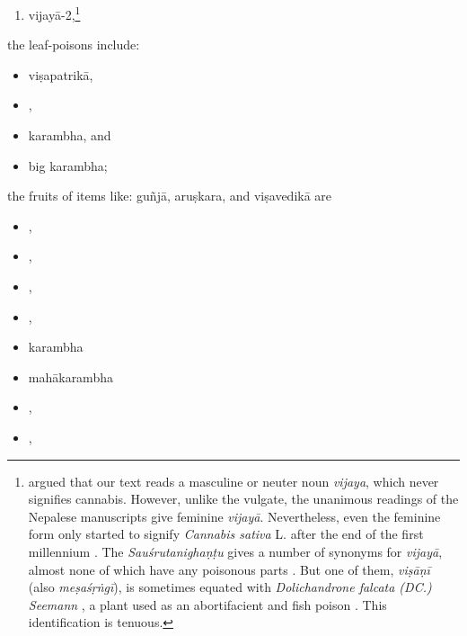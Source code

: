 \begin{translation}
\begin{itemize}
\begin{enumerate}
\item \gls{vijayā-2},\footnote{\citet[61, n.\,3]{meul-sear} argued that
    our text reads a masculine or neuter noun \emph{vijaya}, which never
    signifies cannabis. However, unlike the vulgate, the unanimous
    readings of the Nepalese manuscripts give feminine \emph{vijayā}. 
    Nevertheless, even the feminine form only started to signify
    \emph{Cannabis sativa} L. after the end of the first millennium
    \citep{meul-sear,wuja-cann,mchu-2021}. The \emph{Sauśrutanighaṇṭu}
    gives a number of synonyms for \emph{vijayā}, almost none of which
    have any poisonous parts \citep[5.77, 10.143]{suve-2000}.  But one of
    them, \emph{viṣāṇī} (also \emph{meṣaśṛṅgī}), is sometimes equated with
    \emph{Dolichandrone falcata (DC.) Seemann} \citep[518]{adps}, a plant
    used as an abortifacient and fish poison \citep[\#862]{NK}.  This
    identification is tenuous.} %
        \end{enumerate}
        \end{itemize}
    
    
    
        \item
        the leaf-poisons include:
             \begin{itemize}            
        \item \gls{viṣapatrikā},
        \item {},
        \item \gls{karambha},
        and
        \item big \gls{karambha};
            \end{itemize}
        \item
        the fruits of items like:
        \gls{guñjā},
        \gls{aruṣkara},
        and
        \gls{viṣavedikā}
        are
\begin{itemize}
         \item {},	
        \item {},
    \item {},
    \item {},
    \item \gls{karambha}
    \item \gls{mahākarambha}
    \item {},
    \item {},
\end{itemize}
   

\end{translation}
